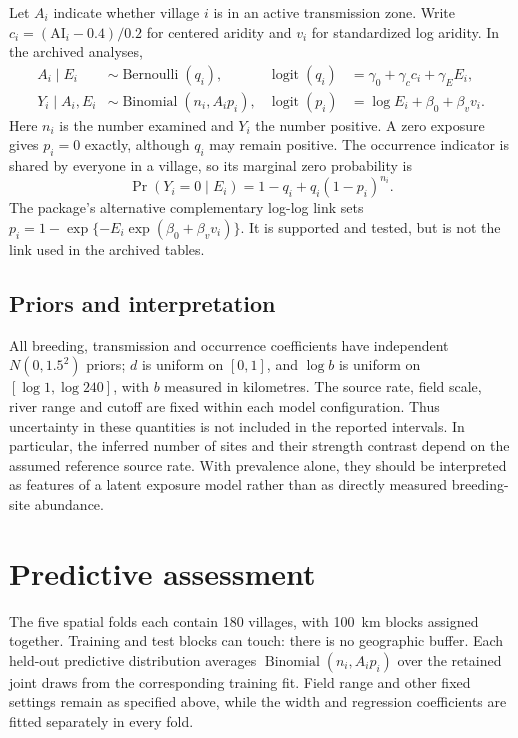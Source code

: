 \documentclass[11pt,a4paper]{article}
\begin{document}
Let $A_i$ indicate whether village $i$ is in an active transmission zone. Write $c_i=(\mathrm{AI}_i-0.4)/0.2$ for centered aridity and $v_i$ for standardized log aridity. In the archived analyses,
\begin{align*}
 A_i\mid E_i&\sim\operatorname{Bernoulli}(q_i), &
 \operatorname{logit}(q_i)&=\gamma_0+\gamma_c c_i+\gamma_E E_i,\\
 Y_i\mid A_i,E_i&\sim\operatorname{Binomial}(n_i,A_i p_i), &
 \operatorname{logit}(p_i)&=\log E_i+\beta_0+\beta_v v_i.
\end{align*}
Here $n_i$ is the number examined and $Y_i$ the number positive. A zero exposure gives $p_i=0$ exactly, although $q_i$ may remain positive. The occurrence indicator is shared by everyone in a village, so its marginal zero probability is
\[
 \Pr(Y_i=0\mid E_i)=1-q_i+q_i(1-p_i)^{n_i}.
\]
The package's alternative complementary log-log link sets $p_i=1-\exp\{-E_i\exp(\beta_0+\beta_v v_i)\}$. It is supported and tested, but is not the link used in the archived tables.

\subsection{Priors and interpretation}

All breeding, transmission and occurrence coefficients have independent $N(0,1.5^2)$ priors; $d$ is uniform on $[0,1]$, and $\log b$ is uniform on $[\log 1,\log 240]$, with $b$ measured in kilometres. The source rate, field scale, river range and cutoff are fixed within each model configuration. Thus uncertainty in these quantities is not included in the reported intervals. In particular, the inferred number of sites and their strength contrast depend on the assumed reference source rate. With prevalence alone, they should be interpreted as features of a latent exposure model rather than as directly measured breeding-site abundance.



\section{Predictive assessment}

The five spatial folds each contain 180 villages, with 100~km blocks assigned together. Training and test blocks can touch: there is no geographic buffer. Each held-out predictive distribution averages $\operatorname{Binomial}(n_i,A_i p_i)$ over the retained joint draws from the corresponding training fit. Field range and other fixed settings remain as specified above, while the width and regression coefficients are fitted separately in every fold.
\end{document}

